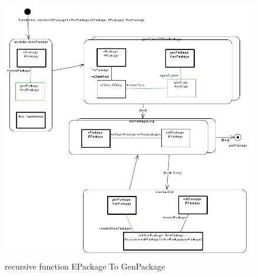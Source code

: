 \begin{figure}[htbp]
\begin{center}  
\includegraphics[width=1.0\textwidth]{pics/Ecore2GenModel_Bilder/EA_transPack2gM.png}
\caption{recursive function EPackage To GenPackage}  
\label{fig_transf}
\end{center}
\end{figure} 


